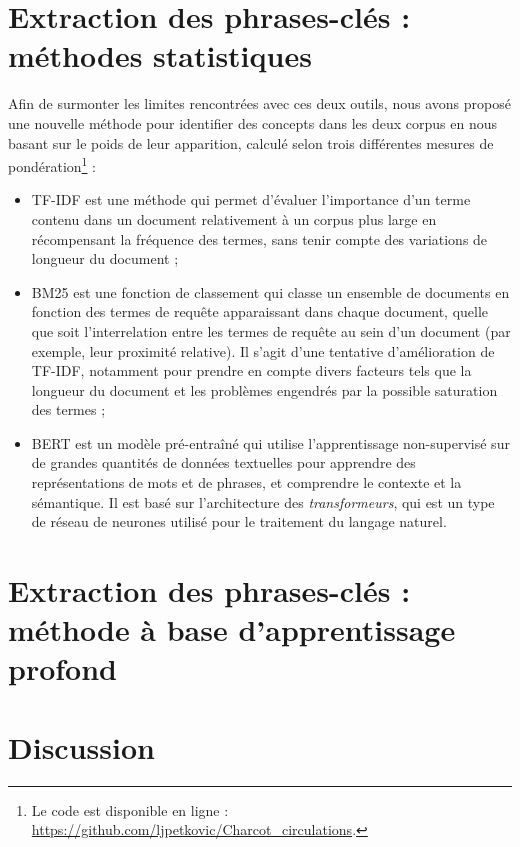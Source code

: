 \section{Extraction des phrases-clés : méthodes statistiques}
\label{methodo_stat}
Afin de surmonter les limites rencontrées avec ces deux outils, nous avons proposé une nouvelle méthode pour identifier des concepts dans les deux corpus en nous basant sur le poids de leur apparition, calculé selon trois différentes mesures de pondération\footnote{Le code est disponible en ligne : \url{https://github.com/ljpetkovic/Charcot\_circulations}.} :
\begin{itemize}
\item \textsc{TF-IDF} est une méthode qui permet d'évaluer l'importance d'un terme contenu dans un document relativement à un corpus plus large en récompensant la fréquence des termes, sans tenir compte des variations de longueur du document ;
\item \textsc{BM25} est une fonction de classement qui classe un ensemble de documents en fonction des termes de requête apparaissant dans chaque document, quelle que soit l'interrelation entre les termes de requête au sein d'un document (par exemple, leur proximité relative). Il s'agit d'une tentative d'amélioration de \textsc{TF-IDF}, notamment pour prendre en compte divers facteurs tels que la longueur du document et les problèmes engendrés par la possible saturation des termes \citep{robertson1976relevance} ;
\item \textsc{BERT} \citep{devlin2019} est un modèle pré-entraîné qui utilise l'apprentissage non-supervisé sur de grandes quantités de données textuelles pour apprendre des représentations de mots et de phrases, et comprendre le contexte et la sémantique. Il est basé sur l'architecture des \textit{transformeurs}, qui est un type de réseau de neurones utilisé pour le traitement du langage naturel.
\end{itemize}
\section{Extraction des phrases-clés : méthode à base d'apprentissage profond}
\section{Discussion}
